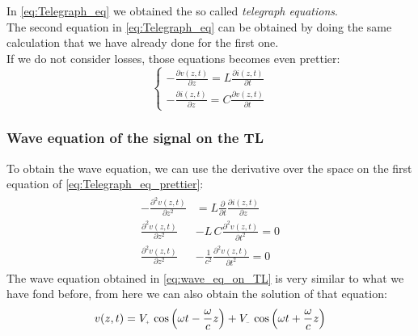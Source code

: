 In \cref{eq:Telegraph_eq} we obtained the so called \emph{telegraph equations}.\\
The second equation in \cref{eq:Telegraph_eq} can be obtained by doing the same calculation that we have already done for the first one.\\
If we do not consider losses, those equations becomes even prettier:
\begin{equation}\label{eq:Telegraph_eq_prettier}
  \begin{cases}
  -\frac{\partial v(z,t)}{\partial z}=L\frac{\partial i(z,t)}{\partial t}\\[5pt]
  -\frac{\partial i(z,t)}{\partial z}=C\frac{\partial v(z,t)}{\partial t}
  \end{cases}
\end{equation}
\subsubsection*{Wave equation of the signal on the TL}
To obtain the wave equation, we can use the derivative over the space on the first equation of \cref{eq:Telegraph_eq_prettier}:
\begin{align}
  \begin{split}
  -\frac{\partial^2 v(z,t)}{\partial z^2}&=L\frac{\partial}{\partial t}\frac{\partial i(z,t)}{\partial z}\\[5pt]
  \frac{\partial^2 v(z,t)}{\partial z^2}&-L\,C\frac{\partial^2 v(z,t)}{\partial t^2}=0\\[5pt]
  \frac{\partial^2 v(z,t)}{\partial z^2}&-\frac{1}{c^2}\frac{\partial^2 v(z,t)}{\partial t^2}=0
  \end{split}\label{eq:wave_eq_on_TL}
\end{align}
The wave equation obtained in \cref{eq:wave_eq_on_TL} is very similar to what we have fond before, from here we can also obtain the solution of that equation:
\begin{equation}
  v(z,t)=V\bottomPlus \,\cos\left(\omega t-\frac{\omega}{c}z\right)+V\bottomMinus \,\cos\left(\omega t+\frac{\omega}{c}z\right)
\end{equation}
